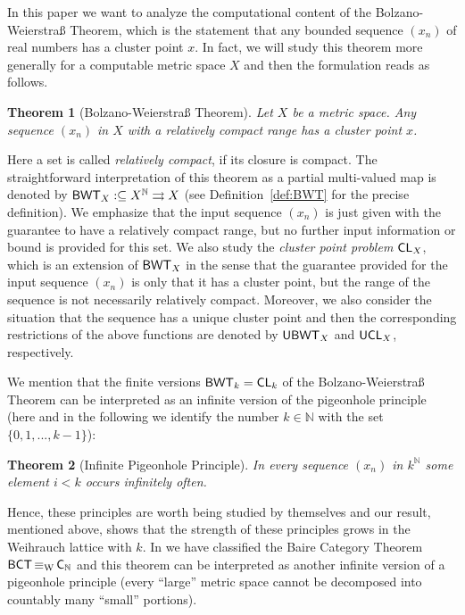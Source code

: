 \documentclass[a4paper]{amsart}
\def\IN{{\mathbb{N}}}
\def\In{\subseteq}
\def\mto{\rightrightarrows}
\def\BCT{\text{\rm\sffamily BCT}}
\def\BWT{\text{\rm\sffamily BWT}}
\def\C{\mbox{\rm\sffamily C}}
\def\UBWT{\text{\rm\sffamily UBWT}}
\def\CL{\text{\rm\sffamily CL}}
\def\UCL{\text{\rm\sffamily UCL}}
\def\equivW{\mathop{\equiv_{\mathrm{W}}}}
\newtheorem{theorem}{Theorem}[section]
\theoremstyle{definition}
\begin{document}
In this paper we want to analyze the computational content of the Bolzano-Weierstra\ss{} Theorem, which is the statement 
that any bounded sequence $(x_n)$ of real numbers has a cluster point $x$. In fact, we will study this theorem more generally for
a computable metric space $X$ and then the formulation reads as follows.

\begin{theorem}[Bolzano-Weierstra\ss{} Theorem]
Let $X$ be a metric space.
Any sequence $(x_n)$ in $X$ with a relatively compact range has a cluster point $x$.
\end{theorem}

Here a set is called {\em relatively compact}, if its closure is compact.
The straightforward interpretation of this theorem as a partial multi-valued map is denoted by $\BWT_X:\In X^\IN\mto X$ 
(see Definition~\ref{def:BWT} for the precise definition). We emphasize that the input sequence $(x_n)$ is just
given with the guarantee to have a relatively compact range, but no further input information or bound is provided for this set.
We also study the {\em cluster point problem} $\CL_X$, which is an extension of $\BWT_X$ in the sense that the guarantee
provided for the input sequence $(x_n)$ is only that it has a cluster point, but the range of the sequence is not necessarily
relatively compact. Moreover, we also consider the situation that the sequence has a unique cluster point and then the
corresponding restrictions of the above functions are denoted by $\UBWT_X$ and $\UCL_X$, respectively.

We mention that the finite versions $\BWT_k=\CL_k$ of the
Bolzano-Weierstra\ss{} Theorem can be interpreted as an infinite version of the pigeonhole principle
(here and in the following we identify the number $k\in\IN$ with the set $\{0,1,...,k-1\}$):

\begin{theorem}[Infinite Pigeonhole Principle]
In every sequence $(x_n)$ in $k^\IN$ some element $i<k$ occurs infinitely often.
\end{theorem}
 
Hence, these principles are worth being studied by themselves and our result, mentioned above, shows that the
strength of these principles grows in the Weihrauch lattice with $k$. In \cite{BG11a} we have classified the 
Baire Category Theorem $\BCT\equivW\C_\IN$ and this theorem can be interpreted as another infinite version
of a pigeonhole principle (every ``large'' metric space cannot be decomposed into countably many ``small'' portions).
\end{document}
